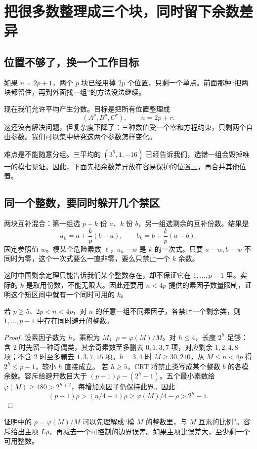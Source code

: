 \chapter{把很多数整理成三个块，同时留下余数差异}\label{sec:compression}
\section{位置不够了，换一个工作目标}
如果 $n=2p+1$，两个 $p$ 块已经用掉 $2p$ 个位置，只剩一个单点。前面那种“把两块都留住，再到外面找一组”的方法没法继续。

现在我们允许平均产生分数。目标是把所有位置整理成
\[(A^p,B^p,C^r),\qquad n=2p+r.
\]
这还没有解决问题，但复杂度下降了：三种数值受一个零和方程约束，只剩两个自由参数。我们可以集中研究这两个参数怎样变化。

难点是不能随意分组。三平均的 $(3^5,1,-16)$ 已经告诉我们，选错一组会毁掉唯一的模七见证。因此，下面先把余数差异放在容易保护的位置上，再合并其他位置。

\section{同一个整数，要同时躲开几个禁区}
两块互补混合：第一组选 $p-k$ 份 $a$、$k$ 份 $b$，另一组选剩余的互补份数。结果是
\begin{equation}\label{eq:mix-pair}
a_k=a+\frac{k}{p}(b-a),\qquad b_k=b+\frac{k}{p}(a-b).
\end{equation}
固定参照值 $w$。模某个危险素数 $\ell$，$a_k-w$ 是 $k$ 的一次式。只要 $a-w,b-w$ 不同时为零，这个一次式要么一直非零，要么只禁止一个 $k$ 余数。

这时中国剩余定理只能告诉我们某个整数存在，却不保证它在 $1,\ldots,p-1$ 里。实际的 $k$ 是取用份数，不能无限大。因此还要用 $n<4p$ 提供的素因子数量限制，证明这个短区间中就有一个同时可用的 $k$。
\begin{lemma}[短区间中的同时避让]\label{lem:short-choice}
若 $p\ge5$、$2p<n<4p$，对 $n$ 的任意一组不同素因子，各禁止一个剩余类，则 $1,\ldots,p-1$ 中存在同时避开的整数。
\end{lemma}
\begin{proof}
设素因子数为 $h$，乘积为 $M$，$\rho=\varphi(M)/M$。对 $h\le4$，长度 $2^h$ 足够：含 $2$ 时先留一种奇偶类，其余奇素数至多删去 $0,1,3,7$ 项，对应剩余 $1,2,4,8$ 项；不含 $2$ 时至多删去 $1,3,7,15$ 项。$h=3,4$ 时 $M\ge30,210$，从 $M\le n<4p$ 得 $2^h\le p-1$，较小 $h$ 直接成立。
若 $h\ge5$，CRT 将禁止类写成某个整数 $b$ 的各模余数。容斥给避开数目大于 $(p-1)\rho-(2^h-1)$。五个最小素数给 $\varphi(M)\ge480>2^{h+2}$，每增加素因子仍保持此界。因此
\[(p-1)\rho>(n/4-1)\rho\ge\varphi(M)/4-\rho>2^h-1.
\]
\end{proof}
证明中的 $\rho=\varphi(M)/M$ 可以先理解成“模 $M$ 的整数里，与 $M$ 互素的比例”。容斥给出主项 $L\rho$，再减去一个可控制的边界误差。如果主项比误差大，至少剩一个可用整数。


